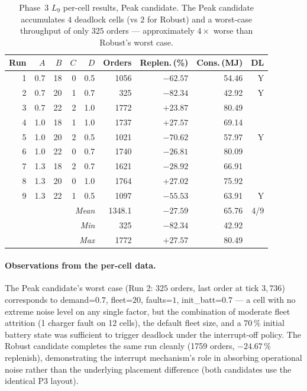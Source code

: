 \documentclass[conference]{IEEEtran}
\begin{document}
\begin{table}[t]
  \centering
  \caption{Phase~3 $L_9$ per-cell results, Peak candidate. The Peak candidate accumulates $4$ deadlock cells (vs $2$ for Robust) and a worst-case throughput of only $325$ orders --- approximately $4{\times}$ worse than Robust's worst case.}
  \label{tab:l9_peak}
  \footnotesize
  \setlength{\tabcolsep}{4pt}
  \begin{tabular}{rrrrrrrrr}
    \toprule
    Run & $A$ & $B$ & $C$ & $D$ & Orders & Replen.\,(\%) & Cons.\,(MJ) & DL \\
    \midrule
     1 & 0.7 & 18 & 0 & 0.5 & 1056 & $-62.57$ & 54.46 & Y \\
     2 & 0.7 & 20 & 1 & 0.7 &  325 & $-82.34$ & 42.92 & Y \\
     3 & 0.7 & 22 & 2 & 1.0 & 1772 & $+23.87$ & 80.49 &   \\
     4 & 1.0 & 18 & 1 & 1.0 & 1737 & $+27.57$ & 69.14 &   \\
     5 & 1.0 & 20 & 2 & 0.5 & 1021 & $-70.62$ & 57.97 & Y \\
     6 & 1.0 & 22 & 0 & 0.7 & 1740 & $-26.81$ & 80.09 &   \\
     7 & 1.3 & 18 & 2 & 0.7 & 1621 & $-28.92$ & 66.91 &   \\
     8 & 1.3 & 20 & 0 & 1.0 & 1764 & $+27.02$ & 75.92 &   \\
     9 & 1.3 & 22 & 1 & 0.5 & 1097 & $-55.53$ & 63.91 & Y \\
    \midrule
    \multicolumn{5}{r}{\textit{Mean}} & 1348.1 & $-27.59$ & 65.76 & 4/9 \\
    \multicolumn{5}{r}{\textit{Min}}  &  325   & $-82.34$ & 42.92 &     \\
    \multicolumn{5}{r}{\textit{Max}}  & 1772   & $+27.57$ & 80.49 &     \\
    \bottomrule
  \end{tabular}
\end{table}

\paragraph{Observations from the per-cell data.}
The Peak candidate's worst case (Run 2: $325$ orders, last order at tick $3{,}736$) corresponds to demand=$0.7$, fleet=$20$, faults=$1$, init\_batt=$0.7$ --- a cell with no extreme noise level on any single factor, but the combination of moderate fleet attrition (1 charger fault on 12 cells), the default fleet size, and a $70\,\%$ initial battery state was sufficient to trigger deadlock under the interrupt-off policy. The Robust candidate completes the same run cleanly (1759 orders, $-24.67\,\%$ replenish), demonstrating the interrupt mechanism's role in absorbing operational noise rather than the underlying placement difference (both candidates use the identical P3 layout).
\end{document}
